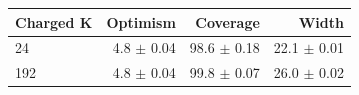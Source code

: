 \begin{tabular}{lrrr}
\toprule
Charged K & Optimism & Coverage & Width \\
\midrule
24 & 4.8 $\pm$ 0.04 & 98.6 $\pm$ 0.18 & 22.1 $\pm$ 0.01 \\
192 & 4.8 $\pm$ 0.04 & 99.8 $\pm$ 0.07 & 26.0 $\pm$ 0.02 \\
\bottomrule
\end{tabular}

